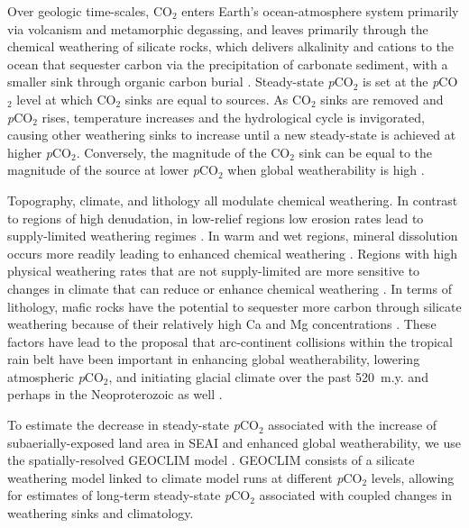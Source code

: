 \documentclass[11pt,letterpaper]{article}
\newcommand{\pCOtwo}{\textit{p}CO$_{2}$\xspace}
\newcommand{\COtwo}{CO$_{2}$\xspace}
\begin{document}
Over geologic time-scales, \COtwo enters Earth's ocean-atmosphere system primarily via volcanism and metamorphic degassing, and leaves primarily through the chemical weathering of silicate rocks, which delivers alkalinity and cations to the ocean that sequester carbon via the precipitation of carbonate sediment, with a smaller sink through organic carbon burial \cite{Kump2000a}. Steady-state \pCOtwo is set at the \pCOtwo level at which \COtwo sinks are equal to sources. As \COtwo sinks are removed and \pCOtwo rises, temperature increases and the hydrological cycle is invigorated, causing other weathering sinks to increase until a new steady-state is achieved at higher \pCOtwo. Conversely, the magnitude of the \COtwo sink can be equal to the magnitude of the source at lower \pCOtwo when global weatherability is high \cite{Kump1997a}.

Topography, climate, and lithology all modulate chemical weathering. In contrast to regions of high denudation, in low-relief regions low erosion rates lead to supply-limited weathering regimes \cite{Gabet2009a, West2012a, Maher2014a}. In warm and wet regions, mineral dissolution occurs more readily leading to enhanced chemical weathering \cite{Lasaga1994a, West2012a}. Regions with high physical weathering rates that are not supply-limited are more sensitive to changes in climate that can reduce or enhance chemical weathering \cite{West2012a, Maher2014a}. In terms of lithology, mafic rocks have the potential to sequester more carbon through silicate weathering because of their relatively high Ca and Mg concentrations \cite{Dessert2003a}. These factors have lead to the proposal that arc-continent collisions within the tropical rain belt have been important in enhancing global weatherability, lowering atmospheric \pCOtwo, and initiating glacial climate over the past 520~m.y. \cite{Jagoutz2016a, Swanson-Hysell2017a, Macdonald2019a} and perhaps in the Neoproterozoic as well \cite{Park2019a}.

To estimate the decrease in steady-state \pCOtwo associated with the increase of subaerially-exposed land area in SEAI and enhanced global weatherability, we use the spatially-resolved GEOCLIM model \cite{Godderis2014a, Godderis2017c}. GEOCLIM consists of a silicate weathering model linked to climate model runs at different \pCOtwo levels, allowing for estimates of long-term steady-state \pCOtwo associated with coupled changes in weathering sinks and climatology.
\end{document}
